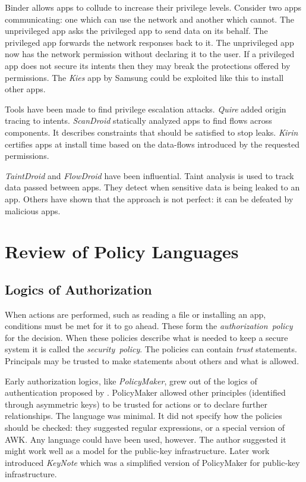 \documentclass[a4paper,sfsidenotes]{tufte-book}
\begin{document}
Binder allows apps to collude to increase their privilege levels.  Consider two
apps communicating: one which can use the network and another which cannot.  The
unprivileged app asks the privileged app to send data on its behalf. The
privileged app forwards the network responses back to it. The unprivileged app
now has the network permission without declaring it to the user.  If a
privileged app does not secure its intents then they may break the protections
offered by permissions. The \emph{Kies} app by Samsung could be exploited like
this to install other apps\cite{moulu:8btkPowj}.

Tools have been made to find privilege escalation attacks.
\emph{Quire}\cite{Bugiel:2012ui} added origin tracing to intents.
\emph{ScanDroid}\cite{Fuchs:2009vi} statically analyzed apps to find flows
across components. It describes constraints that should be satisfied to stop
leaks. \emph{Kirin}\cite{Enck:2009ko} certifies apps at install time based on
the data-flows introduced by the requested permissions.

\emph{TaintDroid}\cite{Enck:2010uw} and \emph{FlowDroid}\cite{Fritz:2013vi}
have been influential.
Taint analysis is used to track
data passed between apps. They detect when sensitive data is being leaked to an
app. Others have shown
that the approach is not perfect\cite{Sarwar:2013ta}: it can be defeated by
malicious apps.


\section{Review of Policy Languages}\label{sec:pollang}

\subsection{Logics of Authorization}

When actions are performed, such as reading a file or installing an app,
conditions must be met for it to go ahead. These form the
\emph{authorization~policy} for the decision. When these policies describe what
is needed to keep a secure system it is called the \emph{security~policy}.  The
policies can contain \emph{trust} statements. Principals may be trusted to make
statements about others and what is allowed.

Early authorization logics, like \emph{PolicyMaker}\cite{Blaze:dj}, grew out of
the logics of authentication proposed by
\citeauthor*{Wobber:1994dh}\cite{Lampson:1992jg}\cite{Wobber:1994dh}.
PolicyMaker allowed other principles (identified through asymmetric keys) to be
trusted for actions or to declare further relationships. The language was
minimal. It did not specify how the policies should be checked: they suggested
regular expressions, or  a special version of AWK. Any language could have been
used, however.  The author suggested it might work well as a model for the
public-key infrastructure. Later work introduced
\emph{KeyNote}\cite{Blaze:1999fa} which was a simplified version of PolicyMaker
for public-key infrastructure.
\end{document}
